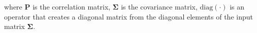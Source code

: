 \noindent where
$
\mathbf{P}
$
is the correlation matrix,
$
\boldsymbol{\Sigma}
$
is the covariance matrix,
$
\mathrm{diag}
\left(
\cdot
\right)
$
is an operator that creates a diagonal matrix
from the diagonal elements
of the input matrix
$
\boldsymbol{\Sigma}
$.
